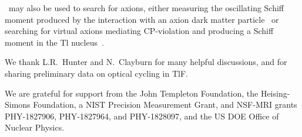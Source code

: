\CENTREX\ may also be used to search for axions, either measuring the oscillating Schiff moment produced by the interaction with an axion dark matter particle~\cite{PhysRevD.89.043522} or searching for virtual axions mediating CP-violation and producing a Schiff moment in the Tl nucleus~\cite{PhysRevLett.120.013202, PhysRevD.98.035048}.

We thank L.R.\ Hunter and N.\ Clayburn for many helpful discussions, and for sharing preliminary data on optical cycling in TlF. 

We are grateful for support from the John Templeton Foundation, the Heising-Simons Foundation, a NIST Precision Measurement Grant, and NSF-MRI grants PHY-1827906, PHY-1827964, and PHY-1828097, and the US DOE Office of Nuclear Physics.

